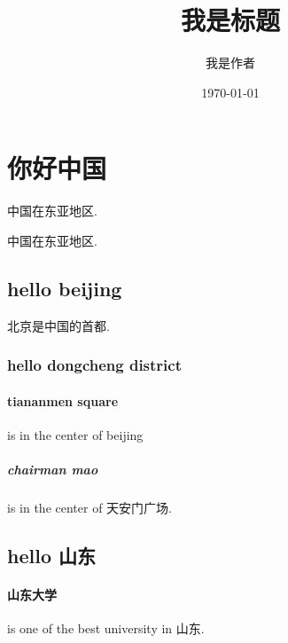 \documentclass[UTF8]{ctexart}
\title{我是标题}
\author{我是作者}
\date{\today}
\begin{document}
\tableofcontents
\maketitle
\section{你好中国}
中国在东亚地区.

中国在东亚地区.
\subsection{hello beijing}
北京是中国的首都.
\subsubsection{hello dongcheng district}
\paragraph{tiananmen square}
is in the center of beijing
\subparagraph{chairman mao}
is in the center of 天安门广场.
\subsection{hello 山东}
\paragraph{山东大学}is one of the best university in 山东.
\end{document}
